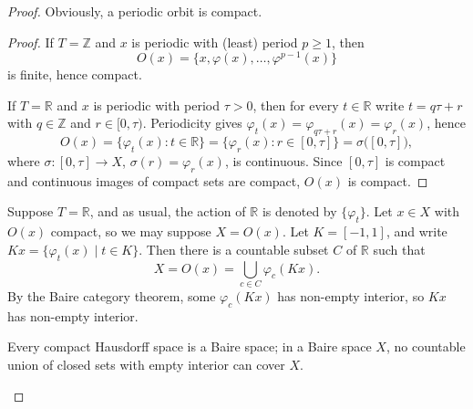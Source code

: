 \begin{proof}
    Obviously, a periodic orbit is compact.
    \begin{mynote}
        \begin{proof}
            If $T=\mathbb Z$ and $x$ is periodic with (least) period $p\ge1$, then
            \[
                O(x)=\{x,\varphi(x),\dots,\varphi^{p-1}(x)\}
            \]
            is finite, hence compact.

            If $T=\mathbb R$ and $x$ is periodic with period $\tau>0$, then for every $t\in\mathbb R$ write
            $t=q\tau+r$ with $q\in\mathbb Z$ and $r\in[0,\tau)$. Periodicity gives
            $\varphi_t(x)=\varphi_{q\tau+r}(x)=\varphi_r(x)$, hence
            \[
                O(x)=\{\varphi_t(x):t\in\mathbb R\}=\{\varphi_r(x):r\in[0,\tau]\}
                =\sigma\bigl([0,\tau]\bigr),
            \]
            where $\sigma:[0,\tau]\to X$, $\sigma(r)=\varphi_r(x)$, is continuous.
            Since $[0,\tau]$ is compact and continuous images of compact sets are compact,
            $O(x)$ is compact.
        \end{proof}
    \end{mynote}
    Suppose $T = \mathbb{R}$, and as usual, the action of $\mathbb{R}$ is denoted by $\{\varphi_t\}$. Let $x \in X$ with $O(x)$ compact, so we may suppose $X = O(x)$. Let $K = [-1,1]$, and write $Kx = \{\varphi_t(x) \mid t \in K\}$. Then there is a countable subset $C$ of $\mathbb{R}$ such that
    \[
        X = O(x) = \bigcup_{c \in C} \varphi_c(Kx).
    \]
    By the Baire category theorem, some $\varphi_c(Kx)$ has non-empty interior, so $Kx$ has non-empty interior.

    \begin{mynote}
        \begin{theorem*}
            Every compact Hausdorff space is a Baire space; in a Baire space $X$, no countable union of closed sets with empty interior can cover $X$.
        \end{theorem*}


\end{mynote}
\end{proof}
